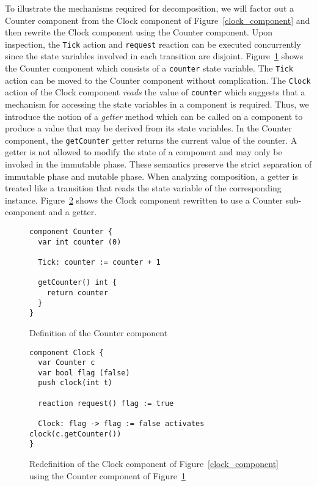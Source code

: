 To illustrate the mechanisms required for decomposition, we will factor out a Counter component from the Clock component of Figure~\ref{clock_component} and then rewrite the Clock component using the Counter component.
Upon inspection, the \verb+Tick+ action and \verb+request+ reaction can be executed concurrently since the state variables involved in each transition are disjoint.
Figure~\ref{counter_component} shows the Counter component which consists of a \verb+counter+ state variable.
The \verb+Tick+ action can be moved to the Counter component without complication.
The \verb+Clock+ action of the Clock component \emph{reads} the value of \verb+counter+ which suggests that a mechanism for accessing the state variables in a component is required.
Thus, we introduce the notion of a \emph{getter} method which can be called on a component to produce a value that may be derived from its state variables.
In the Counter component, the \verb+getCounter+ getter returns the current value of the counter.
A getter is not allowed to modify the state of a component and may only be invoked in the immutable phase.
These semantics preserve the strict separation of immutable phase and mutable phase.
When analyzing composition, a getter is treated like a transition that reads the state variable of the corresponding instance.
Figure~\ref{factored_clock_component} shows the Clock component rewritten to use a Counter sub-component and a getter.

\begin{figure}
\begin{verbatim}
component Counter {
  var int counter (0)

  Tick: counter := counter + 1

  getCounter() int {
    return counter
  }
}
\end{verbatim}
\caption{Definition of the Counter component}
\label{counter_component}
\end{figure}

\begin{figure}
\begin{verbatim}
component Clock {
  var Counter c
  var bool flag (false)
  push clock(int t)

  reaction request() flag := true

  Clock: flag -> flag := false activates clock(c.getCounter())
}
\end{verbatim}
\caption{Redefinition of the Clock component of Figure~\ref{clock_component} using the Counter component of Figure~\ref{counter_component}}
\label{factored_clock_component}
\end{figure}

